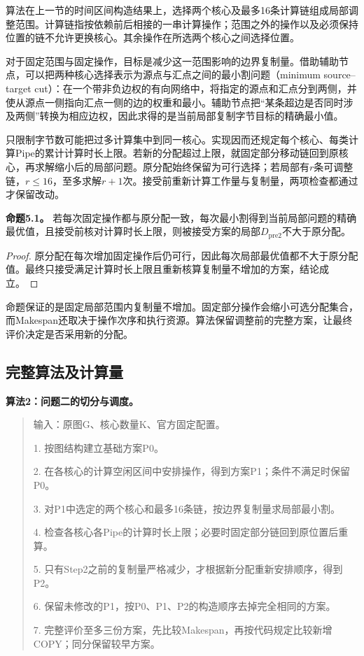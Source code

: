 \documentclass[anonymous,notoc]{gmcm2026}
\begin{document}
算法在上一节的时间区间构造结果上，选择两个核心及最多16条计算链组成局部调整范围。计算链指按依赖前后相接的一串计算操作；范围之外的操作以及必须保持位置的链不允许更换核心。其余操作在所选两个核心之间选择位置。

对于固定范围与固定操作，目标是减少这一范围影响的边界复制量。借助辅助节点，可以把两种核心选择表示为源点与汇点之间的最小割问题（minimum source--target cut）：在一个带非负边权的有向网络中，将指定的源点和汇点分到两侧，并使从源点一侧指向汇点一侧的边的权重和最小。辅助节点把``某条超边是否同时涉及两侧''转换为相应边权，因此求得的是当前局部复制字节目标的精确最小值。

只限制字节数可能把过多计算集中到同一核心。实现因而还规定每个核心、每类计算Pipe的累计计算时长上限。若新的分配超过上限，就固定部分移动链回到原核心，再求解缩小后的局部问题。原分配始终保留为可行选择；若局部有\(r\)条可调整链，\(r\le16\)，至多求解\(r+1\)次。接受前重新计算工作量与复制量，两项检查都通过才保留改动。

\textbf{命题5.1。} 若每次固定操作都与原分配一致，每次最小割得到当前局部问题的精确最优值，且接受前核对计算时长上限，则被接受方案的局部\(D_{\mathrm{pre2}}\)不大于原分配。

\begin{proof} 原分配在每次增加固定操作后仍可行，因此每次局部最优值都不大于原分配值。最终只接受满足计算时长上限且重新核算复制量不增加的方案，结论成立。\end{proof}

命题保证的是固定局部范围内复制量不增加。固定部分操作会缩小可选分配集合，而Makespan还取决于操作次序和执行资源。算法保留调整前的完整方案，让最终评价决定是否采用新的分配。

\subsection{完整算法及计算量}

\textbf{算法2：问题二的切分与调度。}

\begin{quote}
输入：原图G、核心数量K、官方固定配置。

1. 按图结构建立基础方案P0。

2. 在各核心的计算空闲区间中安排操作，得到方案P1；条件不满足时保留P0。

3. 对P1中选定的两个核心和最多16条链，按边界复制量求局部最小割。

4. 检查各核心各Pipe的计算时长上限；必要时固定部分链回到原位置后重算。

5. 只有Step2之前的复制量严格减少，才根据新分配重新安排顺序，得到P2。

6. 保留未修改的P1，按P0、P1、P2的构造顺序去掉完全相同的方案。

7. 完整评价至多三份方案，先比较Makespan，再按代码规定比较新增COPY；同分保留较早方案。
\end{quote}
\end{document}
